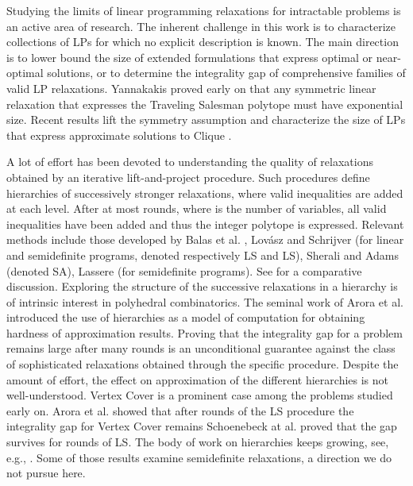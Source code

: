\documentclass[11pt]{article}\usepackage{amsmath}
\begin{document}
Studying the limits of linear programming  relaxations for 
intractable problems is
an active area of research. 
The inherent challenge in this work is  to characterize collections
of LPs 
for which no explicit description is known. 
The
main  direction is to lower bound 
the size of extended formulations
that express optimal or near-optimal solutions,
or to determine
the  integrality gap of  comprehensive families  of
valid LP relaxations. 
  Yannakakis \cite{Yannakakis91}  proved early on that 
any 
symmetric linear relaxation that expresses the Traveling Salesman
polytope must have exponential size. 
 Recent results lift the symmetry assumption 
\cite{FioriniMPTD12}   and  characterize  the size of LPs that
express approximate solutions  to Clique \cite{BraunFPS12,BravermanM13}. 


A lot of effort has been  devoted to 
understanding the quality of relaxations obtained by an iterative 
lift-and-project procedure. Such procedures define hierarchies of 
successively  stronger relaxations, where  valid inequalities are added at 
each level. After at most  rounds, where  is the number of 
variables, all 
valid inequalities have been  added and thus the integer polytope is
expressed. 
Relevant methods  include those  developed  by Balas et
al. \cite{BalasCC93},  Lov\'{a}sz and Schrijver \cite{LovaszS91} (for
linear and semidefinite programs, denoted respectively LS and LS), 
Sherali and Adams \cite{SheraliA90} (denoted SA),    Lassere  \cite{Lasserre01}
(for semidefinite programs). 
See
\cite{laurent} for a comparative discussion.  
Exploring the
structure of the successive relaxations  in a hierarchy 
is of intrinsic interest in polyhedral
combinatorics. The seminal work of Arora et al.
\cite{AroraBL02,AroraBLT06} introduced the use of 
hierarchies as a model of computation for obtaining  hardness of
approximation results. 
Proving that the integrality 
gap for a problem remains large  after many 
rounds   is an unconditional  guarantee against the  class of
sophisticated relaxations
obtained through the specific procedure. 
Despite the amount of effort, the effect on approximation  of the
 different hierarchies is not well-understood. Vertex Cover is a
  prominent case among the problems studied early on. 
Arora et al. \cite{AroraBLT06} showed that after
 rounds of the LS procedure the
integrality gap for Vertex Cover remains  Schoenebeck at
al. \cite{SchoenebeckTT07} proved that the  gap survives
for  rounds of  LS. The body of 
work on   hierarchies keeps growing, see, e.g., 
\cite{GeorgiouMPT10,FernandezdlVKM07,SchoenebeckTT07b,CharikarMM09,MathieuS09,Tulsiani09,BhaskaraCVGZ12}. Some
of
those results examine  semidefinite relaxations, a direction we do not
 pursue here. 
\end{document}
